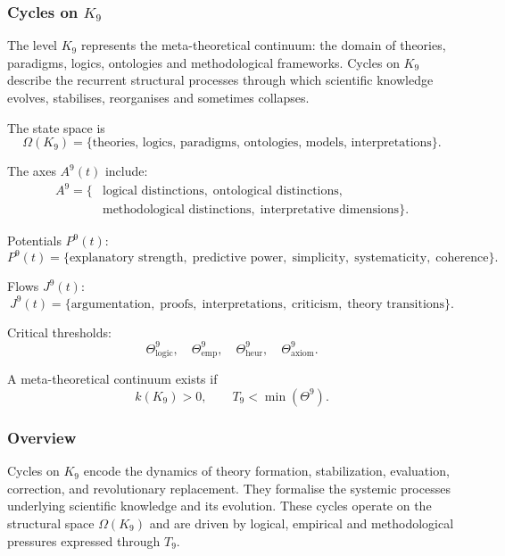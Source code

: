 
\subsubsection{Cycles on \texorpdfstring{$K_9$}{K_9}}
\label{sec:cycles-k9}

The level $K_9$ represents the meta-theoretical continuum: the domain of
theories, paradigms, logics, ontologies and methodological frameworks.
Cycles on $K_9$ describe the recurrent structural processes through which
scientific knowledge evolves, stabilises, reorganises and sometimes collapses.

The state space is
\[
  \Omega(K_9)
  =
  \{\text{theories, logics, paradigms, ontologies, models, interpretations}\}.
\]

The axes $A^9(t)$ include:
\[
  \begin{aligned}
  A^9 = \{&
     \text{logical distinctions},\;
     \text{ontological distinctions},\\
     &\text{methodological distinctions},\;
     \text{interpretative dimensions}
  \}.
  \end{aligned}
\]

Potentials $P^9(t)$:
\[
  P^9(t)
  = \{\text{explanatory strength},\; \text{predictive power},\;
        \text{simplicity},\; \text{systematicity},\; \text{coherence}\}.
\]

Flows $J^9(t)$:
\[
  J^9(t) = \{
    \text{argumentation},\;
    \text{proofs},\;
    \text{interpretations},\;
    \text{criticism},\;
    \text{theory transitions}
  \}.
\]

Critical thresholds:
\[
  \Theta^9_\mathrm{logic},\quad
  \Theta^9_\mathrm{emp},\quad
  \Theta^9_\mathrm{heur},\quad
  \Theta^9_\mathrm{axiom}.
\]

A meta-theoretical continuum exists if
\[
  k(K_9)>0,\qquad
  T_9 < \min(\Theta^9).
\]


\subsubsection{Overview}

Cycles on $K_9$ encode the dynamics of theory formation, stabilization,
evaluation, correction, and revolutionary replacement. They formalise
the systemic processes underlying scientific knowledge and its evolution.
These cycles operate on the structural space $\Omega(K_9)$ and are driven
by logical, empirical and methodological pressures expressed through $T_9$.


